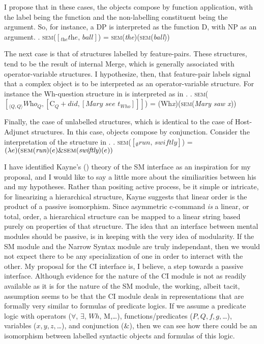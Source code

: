\documentclass[MilwayThesis]{subfiles}
\begin{document}
I propose that in these cases, the objects compose by function application, with the label being the function and the non-labelling constituent being the argument.
So, for instance, a DP is interpreted as the function D, with NP as an argument.
\ex. \textsc{sem}($\left[_\textit{the} \textit{the, ball} \right]$) = \textsc{sem}(\textit{the})(\textsc{sem}(\textit{ball}))

The next case is that of structures labelled by feature-pairs.
These structures, tend to be the result of internal Merge, which is generally associated with operator-variable structures.
I hypothesize, then, that feature-pair labels signal that a complex object is to be interpreted as an operator-variable structure.
For instance the Wh-question structure in \Next[a] is interpreted as in \Next[b].
\ex. \textsc{sem}($\left[_{\langle Q,Q \rangle} \textit{Who}_Q, \left[ \text{C}_Q+\textit{did}, \left[ \textit{Mary see } t_{Who} \right] \right]  \right]$) = (Wh\textit{x})(\textsc{sem}(\textit{Mary saw x}))

Finally, the case of unlabelled structures, which is identical to the case of Host-Adjunct structures.
In this case, objects compose by conjunction.
Consider the interpretation of the structure in \Next.
\ex. \textsc{sem}($\left[_\emptyset \textit{run, swiftly} \right]$) =  $(\lambda e)(\textsc{sem}(\textit{run})(e) \& \textsc{sem}(\textit{swiftly})(e))$


I have identified Kayne's (\citeyear{kayne1994antisymmetry}) theory of the SM interface as an inspiration for my proposal, and I would like to say a little more about the similiarities between his and my hypotheses.
Rather than positing active process, be it simple or intricate, for linearizing a hierarchical structure, Kayne suggests that linear order is the product of a passive isomorphism.
Since asymmetric c-command \textit{is} a linear, or total, order, a hierarchical structure can be mapped to a linear string based purely on properties of that structure.
The idea that an interface between mental modules should be passive, is in keeping with the very idea of modularity.
If the SM module and the Narrow Syntax module are truly independant, then we would not expect there to be any specialization of one in order to interact with the other.
My proposal for the CI interface is, I believe, a step towards a passive interface.
Although evidence for the nature of the CI module is not as readily available as it is for the nature of the SM module, the working, albeit tacit, assumption seems to be that the CI module deals in representations that are formally very similar to formulas of predicate logics.
If we assume a predicate logic with operators ($\forall$, $\exists$, $Wh$, M,\ldots), functions/predicates ($P, Q, f, g,$\ldots), variables ($x, y, z,$\ldots), and conjunction ($\&$), then we can see how there could be an isomorphism between labelled syntactic objects and formulas of this logic.
\end{document}
